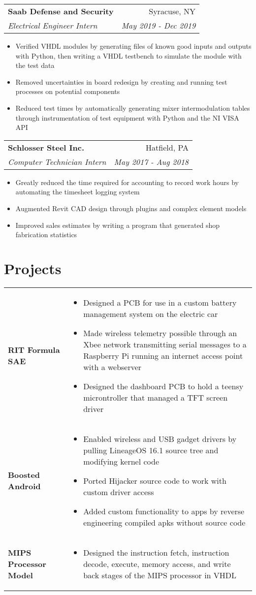 \documentclass[letterpaper,11pt]{article}
\makeatletter
\newcommand{\resumeItem}[1]{
  \item\small{
    #1 \vspace{-4pt}
  }
}
\newcommand{\resumeSubheading}[4]{
  \vspace{2pt}
    \begin{tabular*}{0.97\textwidth}[t]{l@{\extracolsep{\fill}}r}
	\textbf{#1} & #2 \\
	\textit{\small#3}  & \textit{\small#4} \\
    \end{tabular*} \vspace{-5pt}
}
\newcommand{\resumeSubHeadingListStart}{\begin{itemize}[leftmargin=*]}
\newcommand{\resumeSubHeadingListEnd}{\end{itemize}}
\newcommand{\projectItem}[2]{
        \vspace{-15pt} \textbf{#1} & \vspace{-15pt} 
            \begin{itemize}[leftmargin=*,noitemsep,topsep=0pt,parsep=0pt]
                #2 
            \end{itemize} \\
}
\makeatother
\begin{document}
    \resumeSubheading
      {Saab Defense and Security}{Syracuse, NY}
      {Electrical Engineer Intern}{May 2019 - Dec 2019}

    \resumeSubHeadingListStart
      \resumeItem{Verified VHDL modules by generating files of known good inputs and outputs with Python, then writing a VHDL testbench to simulate the module with the test data}
      \resumeItem{Removed uncertainties in board redesign by creating and running test processes on potential components} 
      \resumeItem{Reduced test times by automatically generating mixer intermodulation tables through instrumentation of test equipment with Python and the NI VISA API}
    \resumeSubHeadingListEnd

    \resumeSubheading
      {Schlosser Steel Inc.}{Hatfield, PA}
      {Computer Technician Intern}{May 2017 - Aug 2018}
      \resumeSubHeadingListStart
        \resumeItem{Greatly reduced the time required for accounting to record work hours by automating the timesheet logging system} 
        \resumeItem{Augmented Revit CAD design through plugins and complex element models} 
        \resumeItem{Improved sales estimates by writing a program that generated shop fabrication statistics}
    \resumeSubHeadingListEnd
      


\section{Projects}
    \begin{tabular}{p{0.25\linewidth} p{0.75\linewidth}}
        \vspace{10pt} %
        \projectItem{RIT Formula SAE}{
                \vspace{10pt} %
                \item Designed a PCB for use in a custom battery management system on the electric car
                \item Made wireless telemetry possible through an Xbee network transmitting serial messages to a Raspberry Pi running an internet access point with a webserver
                \item Designed the dashboard PCB to hold a teensy microntroller that managed a TFT screen driver
        }
        \projectItem{Boosted Android}{
                \item Enabled wireless and USB gadget drivers by pulling LineageOS 16.1 source tree and modifying kernel code
                \item Ported Hijacker source code to work with custom driver access
                \item Added custom functionality to apps by reverse engineering compiled apks without source code
        }
        \projectItem{MIPS Processor Model}{
                \item Designed the instruction fetch, instruction decode, execute, memory access, and write back stages of the MIPS processor in VHDL
        }
        \hline
	\end{tabular}
    
\end{document}
